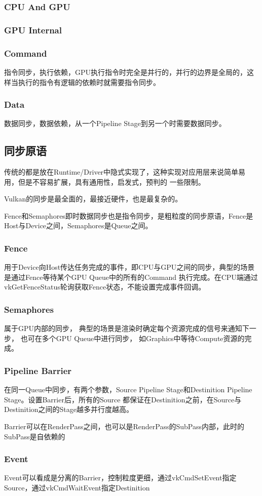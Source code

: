 \subsubsection{CPU And GPU}

\subsubsection{GPU Internal}

\subsubsection{Command}
指令同步，执行依赖，GPU执行指令时完全是并行的，并行的边界是全局的，这样当执行的指令有逻辑的依赖时就需要指令同步。 
\subsubsection{Data}
数据同步，数据依赖，从一个Pipeline Stage到另一个时需要数据同步。

\subsection{同步原语}
传统的都是放在Runtime/Driver中隐式实现了，这种实现对应用层来说简单易用，但是不容易扩展，具有通用性，启发式，预判的
一些限制。

Vulkan的同步是最全面的，最接近硬件，也是最复杂的。

Fence和Semaphores即时数据同步也是指令同步，是粗粒度的同步原语，Fence是Host与Device之间，Semaphores是Queue之间。


\subsubsection{Fence}
用于Device向Host传达任务完成的事件，即CPU与GPU之间的同步，典型的场景是通过Fence等待某个GPU Queue中的所有的Command
执行完成。在CPU端通过vkGetFenceStatus轮询获取Fence状态，不能设置完成事件回调。 

\subsubsection{Semaphores}
属于GPU内部的同步， 典型的场景是渲染时确定每个资源完成的信号来通知下一步， 也可在多个GPU Queue中进行同步，
如Graphics中等待Compute资源的完成。

\subsubsection{Pipeline Barrier}
在同一Queue中同步，有两个参数，Source Pipeline Stage和Destinition Pipeline Stage。设置Barrier后，所有的Source
都保证在Destinition之前，在Source与Destinition之间的Stage越多并行度越高。

Barrier可以在RenderPass之间，也可以是RenderPass的SubPass内部，此时的SubPass是自依赖的

\subsubsection{Event}
Event可以看成是分离的Barrier，控制粒度更细，通过vkCmdSetEvent指定Source，通过vkCmdWaitEvent指定Destinition
